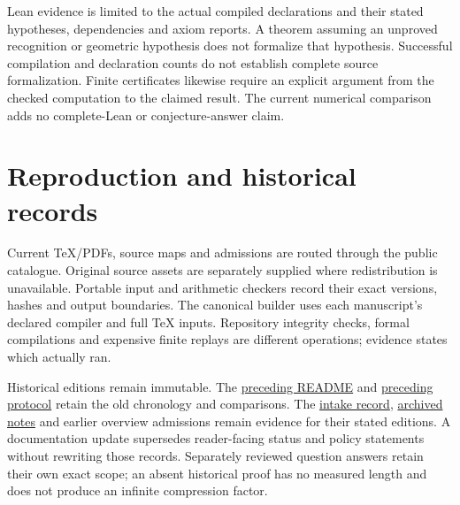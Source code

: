 \documentclass[11pt,a4paper]{article}
\begin{document}
Lean evidence is limited to the actual compiled declarations and their stated
hypotheses, dependencies and axiom reports. A theorem assuming an unproved
recognition or geometric hypothesis does not formalize that hypothesis.
Successful compilation and declaration counts do not establish complete source
formalization. Finite certificates likewise require an explicit argument from
the checked computation to the claimed result. The current numerical comparison
adds no complete-Lean or conjecture-answer claim.

\section{Reproduction and historical records}

Current TeX/PDFs, source maps and admissions are routed through the public
catalogue. Original source assets are separately supplied where redistribution
is unavailable. Portable input and arithmetic checkers record their exact
versions, hashes and output boundaries. The canonical builder uses each
manuscript's declared compiler and full TeX inputs. Repository integrity checks,
formal compilations and expensive finite replays are different operations;
evidence states which actually ran.

Historical editions remain immutable. The
\href{documentation/v1/previous/README.rst}{preceding README} and
\href{documentation/v1/previous/protocol.pdf}{preceding protocol} retain the old
chronology and comparisons. The \href{intake.json}{intake record},
\href{archive\_markdown.json}{archived notes} and earlier overview admissions
remain evidence for their stated editions. A documentation update supersedes
reader-facing status and policy statements without rewriting those records.
Separately reviewed question answers retain their own exact scope; an absent
historical proof has no measured length and does not produce an infinite
compression factor.
\end{document}
